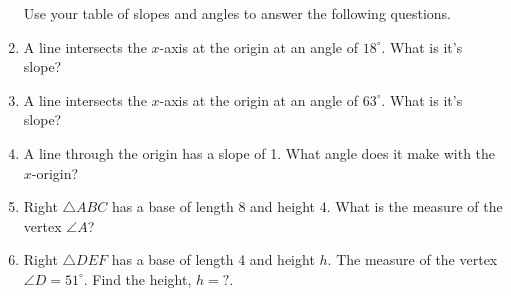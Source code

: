 \documentclass[12pt, twoside]{article}
\begin{document}
\begin{enumerate}
\newpage
Use your table of slopes and angles to answer the following questions. 
\item A line intersects the $x$-axis at the origin at an angle of $18^\circ$. What is it's slope? \vspace{1cm}
\item A line intersects the $x$-axis at the origin at an angle of $63^\circ$. What is it's slope? \vspace{1cm}
\item A line through the origin has a slope of 1. What angle does it make with the $x$-origin? \vspace{1cm}
\item Right $\triangle ABC$ has a base of length 8 and height 4. What is the measure of the vertex $\angle A$?
    \begin{flushright}
    \end{flushright} 

\item Right $\triangle DEF$ has a base of length 4 and height $h$. The measure of the vertex $\angle D = 51^\circ$. Find the height, $h=?$.
    \begin{flushright}
    \end{flushright}

\end{enumerate}
\end{document}
